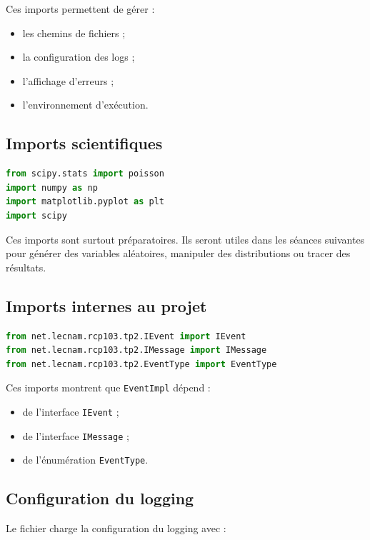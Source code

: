\documentclass{article}
\begin{document}
Ces imports permettent de gérer :
\begin{itemize}[leftmargin=*]
    \item les chemins de fichiers ;
    \item la configuration des logs ;
    \item l’affichage d’erreurs ;
    \item l’environnement d’exécution.
\end{itemize}

\subsection{Imports scientifiques}

\begin{lstlisting}[language=Python, caption=Imports scientifiques]
from scipy.stats import poisson
import numpy as np
import matplotlib.pyplot as plt
import scipy
\end{lstlisting}

Ces imports sont surtout préparatoires. Ils seront utiles dans les séances suivantes pour générer des variables aléatoires, manipuler des distributions ou tracer des résultats.

\subsection{Imports internes au projet}

\begin{lstlisting}[language=Python, caption=Imports internes]
from net.lecnam.rcp103.tp2.IEvent import IEvent
from net.lecnam.rcp103.tp2.IMessage import IMessage
from net.lecnam.rcp103.tp2.EventType import EventType
\end{lstlisting}

Ces imports montrent que \texttt{EventImpl} dépend :
\begin{itemize}[leftmargin=*]
    \item de l’interface \texttt{IEvent} ;
    \item de l’interface \texttt{IMessage} ;
    \item de l’énumération \texttt{EventType}.
\end{itemize}

\subsection{Configuration du logging}

Le fichier charge la configuration du logging avec :
\end{document}
